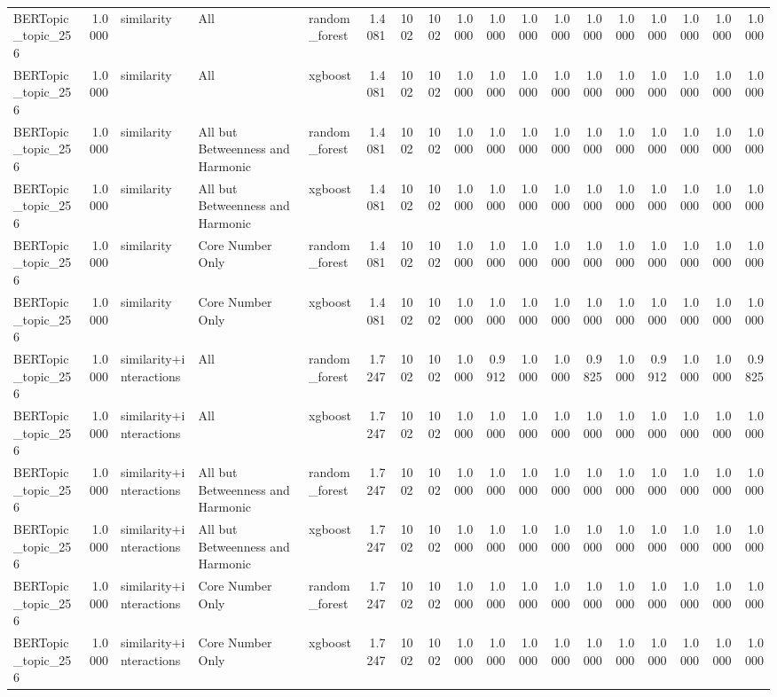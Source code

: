 \begin{tabular}{lrlllrrrrrrrrrrrrr}
BERTopic_topic_256 & 1.0000 & similarity & All & random_forest & 1.4081 & 1002 & 1002 & 1.0000 & 1.0000 & 1.0000 & 1.0000 & 1.0000 & 1.0000 & 1.0000 & 1.0000 & 1.0000 & 1.0000 \\
BERTopic_topic_256 & 1.0000 & similarity & All & xgboost & 1.4081 & 1002 & 1002 & 1.0000 & 1.0000 & 1.0000 & 1.0000 & 1.0000 & 1.0000 & 1.0000 & 1.0000 & 1.0000 & 1.0000 \\
BERTopic_topic_256 & 1.0000 & similarity & All but Betweenness and Harmonic & random_forest & 1.4081 & 1002 & 1002 & 1.0000 & 1.0000 & 1.0000 & 1.0000 & 1.0000 & 1.0000 & 1.0000 & 1.0000 & 1.0000 & 1.0000 \\
BERTopic_topic_256 & 1.0000 & similarity & All but Betweenness and Harmonic & xgboost & 1.4081 & 1002 & 1002 & 1.0000 & 1.0000 & 1.0000 & 1.0000 & 1.0000 & 1.0000 & 1.0000 & 1.0000 & 1.0000 & 1.0000 \\
BERTopic_topic_256 & 1.0000 & similarity & Core Number Only & random_forest & 1.4081 & 1002 & 1002 & 1.0000 & 1.0000 & 1.0000 & 1.0000 & 1.0000 & 1.0000 & 1.0000 & 1.0000 & 1.0000 & 1.0000 \\
BERTopic_topic_256 & 1.0000 & similarity & Core Number Only & xgboost & 1.4081 & 1002 & 1002 & 1.0000 & 1.0000 & 1.0000 & 1.0000 & 1.0000 & 1.0000 & 1.0000 & 1.0000 & 1.0000 & 1.0000 \\
BERTopic_topic_256 & 1.0000 & similarity+interactions & All & random_forest & 1.7247 & 1002 & 1002 & 1.0000 & 0.9912 & 1.0000 & 1.0000 & 0.9825 & 1.0000 & 0.9912 & 1.0000 & 1.0000 & 0.9825 \\
BERTopic_topic_256 & 1.0000 & similarity+interactions & All & xgboost & 1.7247 & 1002 & 1002 & 1.0000 & 1.0000 & 1.0000 & 1.0000 & 1.0000 & 1.0000 & 1.0000 & 1.0000 & 1.0000 & 1.0000 \\
BERTopic_topic_256 & 1.0000 & similarity+interactions & All but Betweenness and Harmonic & random_forest & 1.7247 & 1002 & 1002 & 1.0000 & 1.0000 & 1.0000 & 1.0000 & 1.0000 & 1.0000 & 1.0000 & 1.0000 & 1.0000 & 1.0000 \\
BERTopic_topic_256 & 1.0000 & similarity+interactions & All but Betweenness and Harmonic & xgboost & 1.7247 & 1002 & 1002 & 1.0000 & 1.0000 & 1.0000 & 1.0000 & 1.0000 & 1.0000 & 1.0000 & 1.0000 & 1.0000 & 1.0000 \\
BERTopic_topic_256 & 1.0000 & similarity+interactions & Core Number Only & random_forest & 1.7247 & 1002 & 1002 & 1.0000 & 1.0000 & 1.0000 & 1.0000 & 1.0000 & 1.0000 & 1.0000 & 1.0000 & 1.0000 & 1.0000 \\
BERTopic_topic_256 & 1.0000 & similarity+interactions & Core Number Only & xgboost & 1.7247 & 1002 & 1002 & 1.0000 & 1.0000 & 1.0000 & 1.0000 & 1.0000 & 1.0000 & 1.0000 & 1.0000 & 1.0000 & 1.0000 \\

\end{tabular}
